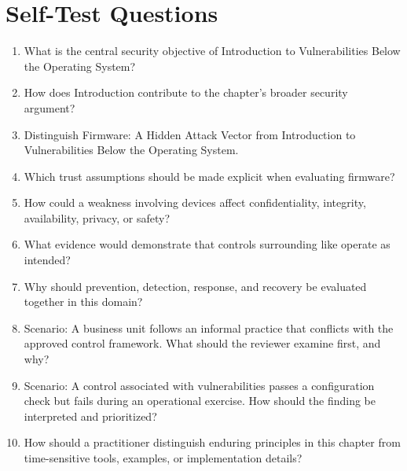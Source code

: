 \documentclass[11pt]{article}
\begin{document}
\section*{Self-Test Questions}
\begin{enumerate}
\item What is the central security objective of Introduction to Vulnerabilities Below the Operating System?
\item How does Introduction contribute to the chapter's broader security argument?
\item Distinguish Firmware: A Hidden Attack Vector from Introduction to Vulnerabilities Below the Operating System.
\item Which trust assumptions should be made explicit when evaluating firmware?
\item How could a weakness involving devices affect confidentiality, integrity, availability, privacy, or safety?
\item What evidence would demonstrate that controls surrounding like operate as intended?
\item Why should prevention, detection, response, and recovery be evaluated together in this domain?
\item Scenario: A business unit follows an informal practice that conflicts with the approved control framework. What should the reviewer examine first, and why?
\item Scenario: A control associated with vulnerabilities passes a configuration check but fails during an operational exercise. How should the finding be interpreted and prioritized?
\item How should a practitioner distinguish enduring principles in this chapter from time-sensitive tools, examples, or implementation details?
\end{enumerate}
\end{document}
